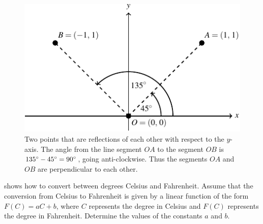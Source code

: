 \documentclass[a4paper,oneside,12pt]{article}
\begin{document}
\begin{problem}
{\begin{solution}
\begin{figure}[!htbp]
\centering
\includegraphics[scale=1.5]{image/06/perpendicular-lines-origin.pdf}
\caption{%
  Two points that are reflections of each other with respect to the
  $y$-axis.  The angle from the line segment $OA$ to the segment $OB$
  is ${135}^{\circ} - {45}^{\circ} = {90}^{\circ}$, going
  anti-clockwise.  Thus the segments $OA$ and $OB$ are perpendicular
  to each other.
}
\label{fig:two_points_reflection_each_other_y_axis}
\end{figure}
\end{solution}
}{}

\begin{table}[!htbp]
\centering

\caption{%
  Temperature conversion from degree Celsius to degree Fahrenheit.
}
\label{tab:temperature_Celsius_to_Fahrenheit}
\end{table}

\item {} shows how to
  convert between degrees Celsius and Fahrenheit.  Assume that the
  conversion from Celsius to Fahrenheit is given by a linear function
  of the form $F(C) = aC + b$, where $C$ represents the degree in
  Celsius and $F(C)$ represents the degree in Fahrenheit.  Determine
  the values of the constants $a$ and $b$.


\end{problem}
\end{document}
